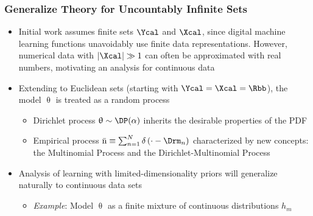 \documentclass[aspectratio=169,usenames,dvipsnames]{beamer}
\DeclareMathOperator{\nbarrm}{\bar{\mathrm{n}}}
\begin{document}
\begin{frame}
\frametitle{Generalize Theory for Uncountably Infinite Sets}

\begin{itemize}
\item Initial work assumes finite sets $\Ycal$ and $\Xcal$, since digital machine learning functions unavoidably use finite data representations. However, numerical data with $|\Xcal| \gg 1$ can often be approximated with real numbers, motivating an analysis for \alert{continuous data}
\vspace{0.5em}
\item Extending to Euclidean sets (starting with $\Ycal = \Xcal = \Rbb$), the model $\uptheta$ is treated as a \alert{random process}
	\vspace{0.25em}
	\begin{itemize}
	\item Dirichlet process $\uptheta \sim \DP(\alpha)$ inherits the desirable properties of the PDF 
	\vspace{0.25em}
	\item Empirical process $\nbarrm \equiv \sum_{n=1}^N \delta\left( \cdot - \Drm_n \right)$ characterized by new concepts: the \alert{Multinomial Process} and the \alert{Dirichlet-Multinomial Process}
	\end{itemize}
\vspace{0.5em}
\item Analysis of learning with limited-dimensionality priors will generalize naturally to continuous data sets
	\vspace{0.25em}
	\begin{itemize}
	\item \emph{Example}: Model $\uptheta$ as a finite mixture of continuous distributions $h_m$
	\end{itemize}
\end{itemize}

\end{frame}
\end{document}
